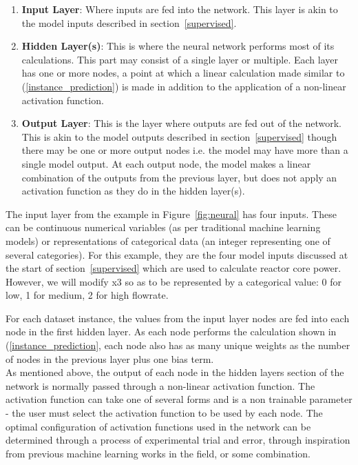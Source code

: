 \begin{enumerate}
	
	\item \textbf{Input Layer}: Where inputs are fed into the network. This layer is akin to the model inputs described in section~\ref{supervised}.
	
	\item \textbf{Hidden Layer(s)}: This is where the neural network performs most of its calculations. This part may consist of a single layer or multiple. Each layer has one or more nodes, a point at which a linear calculation made similar to (\ref{instance_prediction}) is made in addition to the application of a non-linear activation function.
	
	\item \textbf{Output Layer}: This is the layer where outputs are fed out of the network. This is akin to the model outputs described in section~\ref{supervised} though there may be one or more output nodes i.e. the model may have more than a single model output. At each output node, the model makes a linear combination of the outputs from the previous layer, but does not apply an activation function as they do in the hidden layer(s).
	
\end{enumerate}

\noindent
The input layer from the example in Figure~\ref{fig:neural} has four inputs. These can be continuous numerical variables (as per traditional machine learning models) or representations of categorical data (an integer representing one of several categories).  For this example, they are the four model inputs discussed at the start of section~\ref{supervised} which are used to calculate reactor core power. However, we will modify x3 so as to be represented by a categorical value: 0 for low, 1 for medium, 2 for high flowrate. \

\noindent
For each dataset instance, the values from the input layer nodes are fed into each node in the first hidden layer. As each node performs the calculation shown in (\ref{instance_prediction}, each node also has as many unique weights as the number of nodes in the previous layer plus one bias term. \\

\noindent
As mentioned above, the output of each node in the hidden layers section of the network is normally passed through a non-linear activation function. The activation function can take one of several  forms and is a non trainable parameter - the user must select the activation function to be used by each node. The optimal configuration of activation functions used in the network can be determined through a process of experimental trial and error, through inspiration from previous machine learning works in the field, or some combination. \\

